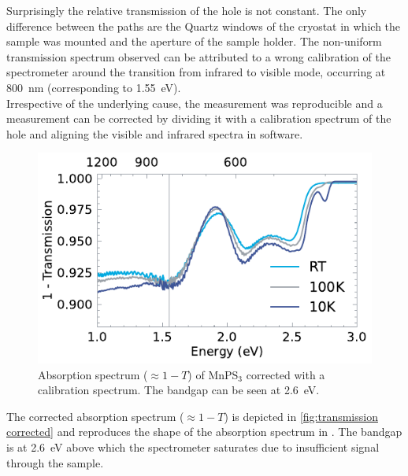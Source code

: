 \documentclass[
	twoside,
	parskip=half,
	a4paper,
]{scrbook}
\begin{document}
Surprisingly the relative transmission of the hole is not constant.
The only difference between the paths are the Quartz windows of the cryostat in which the sample was mounted and the aperture of the sample holder.
The non-uniform transmission spectrum observed can be attributed to a wrong calibration of the spectrometer around the transition from infrared to visible mode, occurring at \SI{800}{nm} (corresponding to \SI{1.55}{eV}).\\
Irrespective of the underlying cause, the measurement was reproducible and a measurement can be corrected by dividing it with a calibration spectrum of the hole and aligning the visible and infrared spectra in software.
\begin{figure}
	\centering
	\includegraphics{../figures/2024-03-15 MnPS3 transmission processed.pdf }
	\caption{Absorption spectrum ($\approx 1- T$) of MnPS$_3$ corrected with a calibration spectrum. The bandgap can be seen at \SI{2.6}{eV}.}
	\label{fig:transmission corrected}
\end{figure}
The corrected absorption spectrum ($\approx 1 - T$) is depicted in \autoref{fig:transmission corrected} and reproduces the shape of the absorption spectrum in \cite{MnPS3_transmission}.
The bandgap is at \SI{2.6}{eV} above which the spectrometer saturates due to insufficient signal through the sample.
\end{document}
